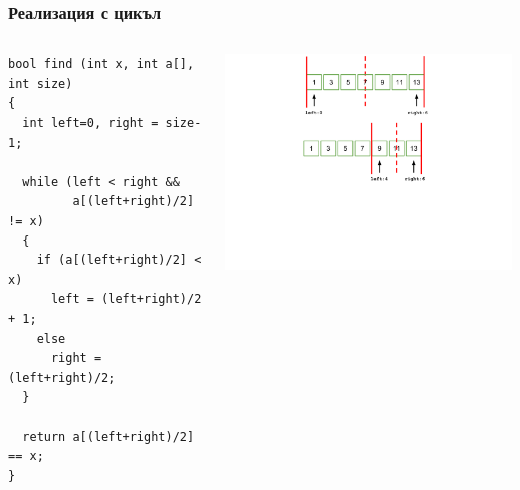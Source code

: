 \documentclass{beamer}
\begin{document}
\begin{frame}[fragile]
\frametitle{Реализация с цикъл}



\begin{columns}[t]
  \begin{column}{0.5\textwidth}

\begin{lstlisting}
bool find (int x, int a[], int size)
{
  int left=0, right = size-1;

  while (left < right &&
         a[(left+right)/2] != x)
  {
    if (a[(left+right)/2] < x)
      left = (left+right)/2 + 1;
    else
      right = (left+right)/2;
  }

  return a[(left+right)/2] == x;
}
\end{lstlisting}


  \end{column}
  \begin{column}{0.5\textwidth}
\vspace*{-1pt}
\hspace*{-50pt}
\includegraphics[width=10cm]{images/binsearch_smaller}

  \end{column}
\end{columns}



\end{frame}
\end{document}
